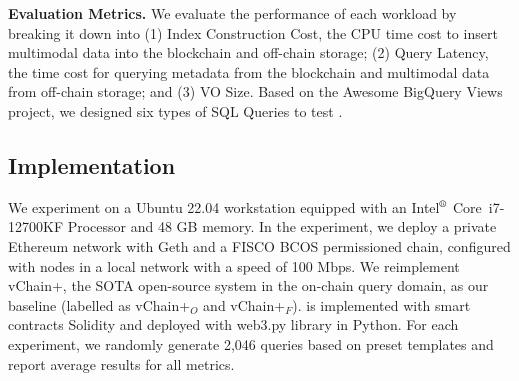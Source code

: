 




\noindent
{\bf Evaluation Metrics.} 
We evaluate the performance of each workload by breaking it down into (1) {Index Construction Cost}, the CPU time cost to insert multimodal data into the blockchain and off-chain storage; (2) {Query Latency}, the time cost for querying metadata from the blockchain and multimodal data from off-chain storage; and (3) {VO Size}. Based on the Awesome BigQuery Views project\cite{awesomeBigquery2022}, we designed six types of SQL Queries to test \Chain.


\subsection{Implementation}
\label{sec:setting}


We experiment on a Ubuntu 22.04 workstation equipped with an Intel\(^\text{\textregistered}\) Core\texttrademark\ i7-12700KF Processor and 48 GB memory. 
In the experiment, we deploy a private Ethereum network with Geth and a FISCO BCOS permissioned chain, configured with nodes in a local network with a speed of 100 Mbps. 
We reimplement vChain+, the SOTA open-source system in the on-chain query domain, as our baseline (labelled as vChain+$_{O}$ and vChain+$_{F}$). \Chain is implemented with smart contracts Solidity and deployed with web3.py library in Python.
For each experiment, we randomly generate 2,046 queries based on preset templates and report average results for all metrics.